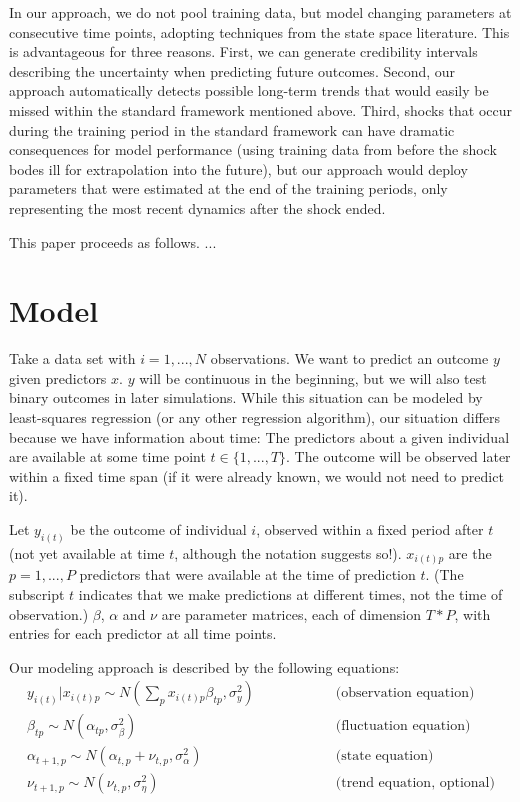 \documentclass{article}
\begin{document}
In our approach, we do not pool training data, but model changing parameters at consecutive time points, adopting techniques from the state space literature. This is advantageous for three reasons. First, we can generate credibility intervals describing the uncertainty when predicting future outcomes. Second, our approach automatically detects possible long-term trends that would easily be missed within the standard framework mentioned above. Third, shocks that occur during the training period in the standard framework can have dramatic consequences for model performance (using training data from before the shock bodes ill for extrapolation into the future), but our approach would deploy parameters that were estimated at the end of the training periods, only representing the most recent dynamics after the shock ended.

This paper proceeds as follows. ...

\section{Model}\label{sec:model}

Take a data set with $i = 1, ..., N$ observations. We want to predict an outcome $y$ given predictors $x$. $y$ will be continuous in the beginning, but we will also test binary outcomes in later simulations. While this situation can be modeled by least-squares regression (or any other regression algorithm), our situation differs because we have information about time: The predictors about a given individual are available at some time point $t \in \{1, ..., T\}$. The outcome will be observed later within a fixed time span (if it were already known, we would not need to predict it).

Let $y_{i(t)}$ be the outcome of individual $i$, observed within a fixed period after $t$ (not yet available at time $t$, although the notation suggests so!). $x_{i(t)p}$ are the $p = 1, ..., P$ predictors that were available at the time of prediction $t$. (The subscript $t$ indicates that we make predictions at different times, not the time of observation.) $\beta$, $\alpha$ and $\nu$ are parameter matrices, each of dimension $T*P$, with entries for each predictor at all time points.

Our modeling approach is described by the following equations:
\begin{eqnarray}
y_{i(t)} | x_{i(t)p} \sim N(\sum_p x_{i(t)p} \beta_{tp}, \sigma_y^2) \textrm{~~~~~~~~~~~~~~~} & \textrm{(observation equation)} \\
\beta_{tp} \sim N(\alpha_{tp}, \sigma^2_{\beta})\textrm{~~~~~~~~~~~~~~~~~~~~~~~~~~~~~~} & \textrm{(fluctuation equation)} \\
\alpha_{t+1,p} \sim N(\alpha_{t,p} + \nu_{t,p}, \sigma^2_{\alpha})\textrm{~~~~~~~~~~~~~~~~~~} & \textrm{(state equation)} \\
\nu_{t+1,p} \sim N(\nu_{t,p}, \sigma^2_{\eta})\textrm{~~~~~~~~~~~~~~~~~~~~~~~~~~~~~~} & \textrm{(trend equation, optional)}
\end{eqnarray}
\end{document}
